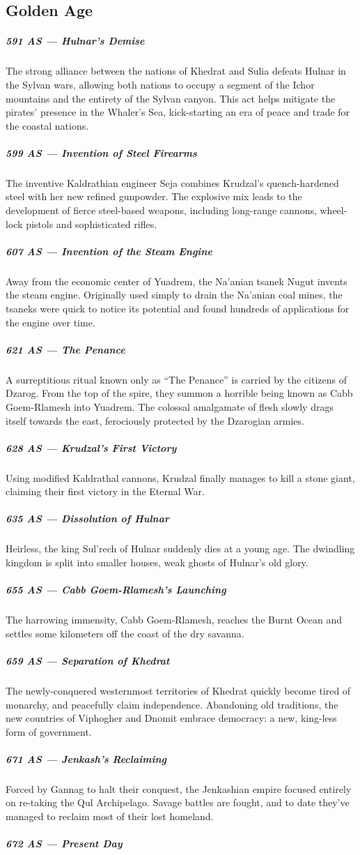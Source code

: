 \subsection*{Golden Age}
\subparagraph{591 AS --- Hulnar's Demise} The strong alliance between the nations of Khedrat and Sulia defeats Hulnar in the Sylvan wars, allowing both nations to occupy a segment of the Ichor mountains and the entirety of the Sylvan canyon.
This act helps mitigate the pirates' presence in the Whaler's Sea, kick-starting an era of peace and trade for the coastal nations.

\subparagraph{599 AS --- Invention of Steel Firearms} The inventive Kaldrathian engineer Seja combines Krudzal's quench-hardened steel with her new refined gunpowder.
The explosive mix leads to the development of fierce steel-based weapons, including long-range cannons, wheel-lock pistols and sophisticated rifles.

\subparagraph{607 AS --- Invention of the Steam Engine} Away from the economic center of Yuadrem, the Na'anian tsanek Nugut invents the steam engine.
Originally used simply to drain the Na'anian coal mines, the tsaneks were quick to notice its potential and found hundreds of applications for the engine over time.

\subparagraph{621 AS --- The Penance} A surreptitious ritual known only as ``The Penance'' is carried by the citizens of Dzarog.
From the top of the spire, they summon a horrible being known as Cabb Goem-Rlamesh into Yuadrem.
The colossal amalgamate of flesh slowly drags itself towards the east, ferociously protected by the Dzarogian armies.

\subparagraph{628 AS --- Krudzal's First Victory} Using modified Kaldrathal cannons, Krudzal finally manages to kill a stone giant, claiming their first victory in the Eternal War.

\subparagraph{635 AS --- Dissolution of Hulnar} Heirless, the king Sul'rech of Hulnar suddenly dies at a young age.
The dwindling kingdom is split into smaller houses, weak ghosts of Hulnar's old glory.

\subparagraph{655 AS --- Cabb Goem-Rlamesh's Launching} The harrowing immensity, Cabb Goem-Rlamesh, reaches the Burnt Ocean and settles some kilometers off the coast of the dry savanna.

\subparagraph{659 AS --- Separation of Khedrat} The newly-conquered westernmost territories of Khedrat quickly become tired of monarchy, and peacefully claim independence.
Abandoning old traditions, the new countries of Viphogher and Dnomit embrace democracy: a new, king-less form of government.

\subparagraph{671 AS --- Jenkash's Reclaiming} Forced by Gannag to halt their conquest, the Jenkashian empire focused entirely on re-taking the Qul Archipelago.
Savage battles are fought, and to date they've managed to reclaim most of their lost homeland.

\subparagraph{672 AS --- Present Day}

\pagebreak
